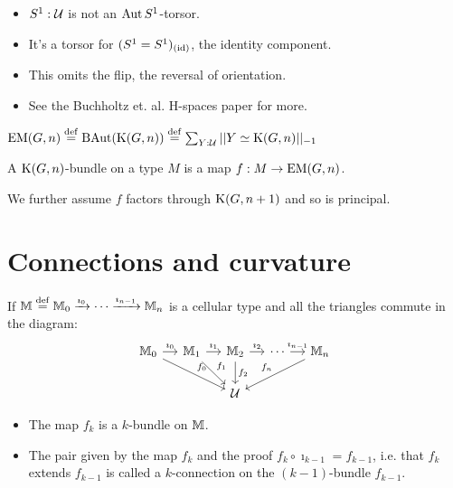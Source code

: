\documentclass[14pt,aspectratio=169]{beamer}
\renewcommand{\defemph}[1]{\alert{#1}}
\begin{document}
\begin{frame}
\begin{itemize}
\item \( S^1:\mathcal{U} \) is not an \( \operatorname{Aut} S^1 \)-torsor.
\item It's a torsor for \( (S^1=S^1)_{(\text{id})} \), the identity component.
\item This omits the flip, the reversal of \alert{orientation}.
\item See the Buchholtz et. al. H-spaces paper for more.
\end{itemize}
\end{frame}

\begin{frame}
\begin{definition}
\( \mathrm{EM}(G,n)\stackrel{\mathrm{def}}{=} \operatorname{BAut}(\mathrm{K}(G,n))\stackrel{\mathrm{def}}{=} \sum_{Y:\mathcal{U}}||Y\simeq \mathrm{K}(G,n)||_{-1} \)
\end{definition}
\begin{definition}
A \defemph{\( \mathrm{K}(G,n) \)-bundle} on a type \( M \) is a map \( f:M\to \mathrm{EM}(G,n) \).
\end{definition}
We further assume \( f \) factors through \( \mathrm{K}(G,n+1) \) and so is principal.
\end{frame}

\section{Connections and curvature}
\begin{frame}
\begin{definition}
If \( \mathbb{M}\stackrel{\mathrm{def}}{=} \mathbb{M}_0\xrightarrow[]{\imath_0}\cdots\xrightarrow[]{\imath_{n-1}}\mathbb{M}_n \) is a cellular type and all the triangles commute in the diagram:\vspace{-10pt}
\[\begin{tikzcd}[ampersand replacement=\&, column sep=small]
  {\mm_0} \& {\mm_1} \& {\mm_2} \& \cdots \& {\mm_n} \\
\&\& {\mathcal{U}}
\arrow["{\imath_0}", from=1-1, to=1-2]
\arrow["{f_0}", from=1-1, to=2-3]
\arrow["{\imath_1}", from=1-2, to=1-3]
\arrow["{f_1}", from=1-2, to=2-3]
\arrow["{\imath_2}", from=1-3, to=1-4]
\arrow["{f_2}", from=1-3, to=2-3]
\arrow["{\imath_{n-1}}", from=1-4, to=1-5]
\arrow["f_n"', from=1-5, to=2-3]
\end{tikzcd}\]\vspace{-15pt}
\begin{itemize}
\item The map \( f_k \) is a \defemph{\( k \)-bundle} on \( \mathbb{M} \).
\item The pair given by the map \( f_k \) and the proof \( f_k\circ \imath_{k-1}=f_{k-1} \), i.e. that \( f_k \) extends \( f_{k-1} \) is called a \defemph{\( k \)-connection on the \( (k-1) \)-bundle \( f_{k-1} \)}.
\end{itemize}
\end{definition}
\end{frame}
\end{document}
